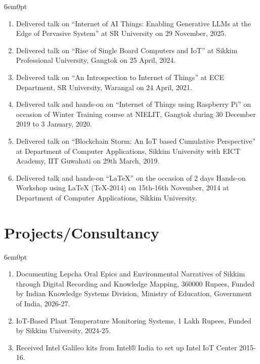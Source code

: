 \documentclass[11pt,a4paper]{moderncv}
\begin{document}
\begin{adjustwidth}{6em}{0pt}
	\begin{enumerate}
		

		
		\item Delivered talk on “Internet of AI Things: Enabling Generative LLMs at the Edge of Pervasive System” at SR University on 29 November, 2025.
			
		\item Delivered talk on “Rise of Single Board Computers and IoT” at Sikkim Professional University, Gangtok on 25 April, 2024.
		
		\item Delivered talk on “An Introspection to Internet of Things” at ECE Department, SR University, Warangal on 24 April, 2021.
		
		\item Delivered talk and hands-on on “Internet of Things using Raspberry Pi” on occasion of Winter Training course at NIELIT, Gangtok during 30 December 2019 to 3 January, 2020.
		
		\item Delivered talk on “Blockchain Storm: An IoT based Cumulative Perspective” at Department of Computer Applications, Sikkim University with EICT Academy, IIT Guwahati on 29th March, 2019.
		
		\item Delivered talk and hands-on “LaTeX” on the occasion of 2 days Hands-on Workshop using LaTeX (TeX-2014) on 15th-16th November, 2014 at Department of Computer Applications, Sikkim University.
		
	\end{enumerate}
\end{adjustwidth}



\section{\textbf{Projects/Consultancy}}

\begin{adjustwidth}{6em}{0pt}
	\begin{enumerate}
		
		\item Documenting Lepcha Oral Epics and Environmental Narratives of Sikkim through Digital Recording and Knowledge Mapping, 360000 Rupees, Funded by Indian Knowledge Systems Division, Ministry of Education, Government of India, 2026-27. 
		
		\item IoT-Based Plant Temperature Monitoring Systems, 1 Lakh Rupees, Funded by Sikkim University, 2024-25.
		
		\item Received Intel Galileo kits from Intel® India to set up Intel IoT Center 2015-16.
		
	\end{enumerate}
\end{adjustwidth}
\end{document}
